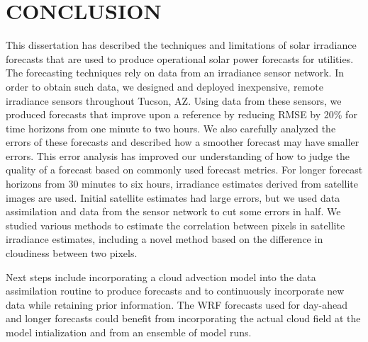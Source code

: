\chapter{CONCLUSION}
\label{chap:conc}

This dissertation has described the techniques and limitations of
solar irradiance forecasts that are used to produce operational solar
power forecasts for utilities.
The forecasting techniques rely on data from an irradiance sensor
network.
In order to obtain such data, we designed and deployed inexpensive,
remote irradiance sensors throughout Tucson, AZ.
Using data from these sensors, we produced forecasts that improve upon
a reference by reducing RMSE by 20\% for time horizons from one minute
to two hours.
We also carefully analyzed the errors of these forecasts and described
how a smoother forecast may have smaller errors.
This error analysis has improved our understanding of how to judge the
quality of a forecast based on commonly used forecast metrics.
For longer forecast horizons from 30 minutes to six hours, irradiance
estimates derived from satellite images are used.
Initial satellite estimates had large errors, but we used data
assimilation and data from the sensor network to cut some errors in
half.
We studied various methods to estimate the correlation between pixels
in satellite irradiance estimates, including a novel method based on
the difference in cloudiness between two pixels.

Next steps include incorporating a cloud advection model into the data
assimilation routine to produce forecasts and to continuously
incorporate new data while retaining prior information.
The WRF forecasts used for day-ahead and longer forecasts could
benefit from incorporating the actual cloud field at the model
intialization and from an ensemble of model runs.



